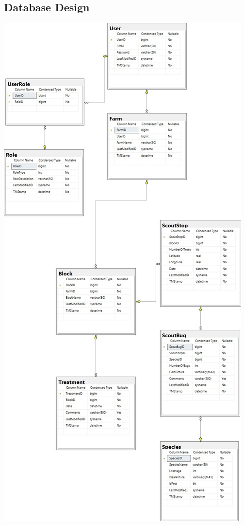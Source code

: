 \documentclass[11pt,a4paper,titlepage]{article}
\begin{document}
	\subsection{Database Design}
	\begin{center}
		\includegraphics[scale=1.0]{ERD}
	\end{center}
\end{document}
